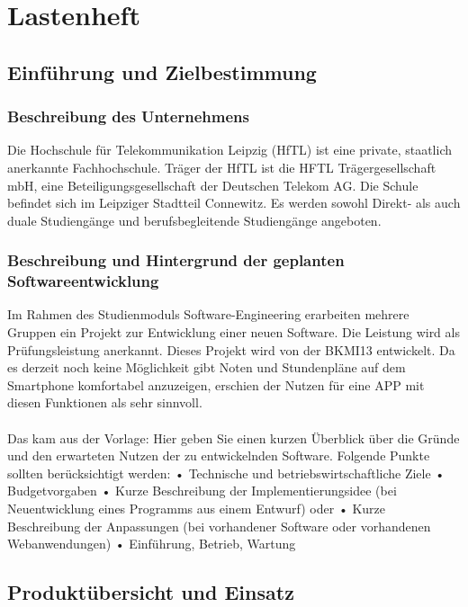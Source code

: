 \section{Lastenheft}

\subsection{Einführung und Zielbestimmung}

\subsubsection{Beschreibung des Unternehmens}
Die Hochschule für Telekommunikation Leipzig (HfTL) ist eine private, staatlich anerkannte Fachhochschule. Träger der HfTL ist die HFTL Trägergesellschaft mbH, eine Beteiligungsgesellschaft der Deutschen Telekom AG. Die Schule befindet sich im Leipziger Stadtteil Connewitz. Es werden sowohl Direkt- als auch duale Studiengänge und berufsbegleitende Studiengänge angeboten.

\subsubsection{Beschreibung und Hintergrund der geplanten Softwareentwicklung}
Im Rahmen des Studienmoduls Software-Engineering erarbeiten mehrere Gruppen ein Projekt zur Entwicklung einer neuen Software. Die Leistung wird als Prüfungsleistung anerkannt.
Dieses Projekt wird von der BKMI13 entwickelt. Da es derzeit noch keine Möglichkeit gibt Noten und Stundenpläne auf dem Smartphone komfortabel anzuzeigen, erschien der Nutzen für eine APP mit diesen Funktionen als sehr sinnvoll.
\\
\\
Das kam aus der Vorlage:
Hier geben Sie einen kurzen Überblick über die Gründe und den erwarteten Nutzen der zu entwickelnden Software. Folgende Punkte sollten berücksichtigt werden:
•	Technische und betriebswirtschaftliche Ziele
•	Budgetvorgaben 
•	Kurze Beschreibung der Implementierungsidee (bei Neuentwicklung eines Programms aus einem Entwurf) oder 
•	Kurze Beschreibung der Anpassungen (bei vorhandener Software oder vorhandenen Webanwendungen)
•	Einführung, Betrieb, Wartung 


 
\subsection{Produktübersicht und Einsatz}

